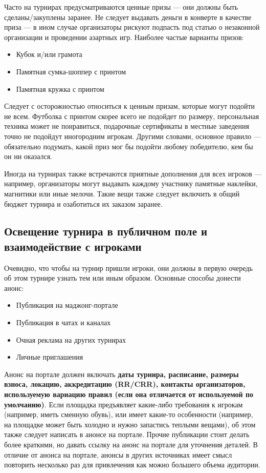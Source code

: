 Часто на турнирах предусматриваются ценные призы --- они должны быть сделаны/закуплены заранее. Не следует выдавать деньги в конверте в качестве приза --- в ином случае организаторы рискуют подпасть под статью о незаконной организации и проведении азартных игр. Наиболее частые варианты призов:
\begin{itemize}
	\item Кубок и/или грамота
	\item Памятная сумка-шоппер с принтом
	\item Памятная кружка с принтом
\end{itemize}

Следует с осторожностью относиться к ценным призам, которые могут подойти не всем. Футболка с принтом скорее всего не подойдет по размеру, персональная техника может не понравиться, подарочные сертификаты в местные заведения точно не подойдут иногородним игрокам. Другими словами, основное правило --- обязательно подумать, какой приз мог бы подойти любому победителю, кем бы он ни оказался.

Иногда на турнирах также встречаются приятные дополнения для всех игроков --- например, организаторы могут выдавать каждому участнику памятные наклейки, магнитики или иные мелочи. Такие вещи также следует включить в общий бюджет турнира и озаботиться их заказом заранее.

\subsection{Освещение турнира в публичном поле и взаимодействие с игроками}

Очевидно, что чтобы на турнир пришли игроки, они должны в первую очередь об этом турнире узнать тем или иным образом. Основные способы донести анонс:
\begin{itemize}
	\item Публикация на маджонг-портале
	\item Публикация в чатах и каналах
	\item Очная реклама на других турнирах
	\item Личные приглашения
\end{itemize}

Анонс на портале должен включать \textbf{даты турнира, расписание, размеры взноса, локацию, аккредитацию (RR/CRR), контакты организаторов, используемую вариацию правил (если она отличается от используемой по умолчанию)}. Если площадка предъявляет какие-либо требования к игрокам (например, иметь сменную обувь), или имеет какие-то особенности (например, на площадке может быть холодно и нужно запастись теплыми вещами), об этом также следует написать в анонсе на портале. Прочие публикации стоит делать более краткими, но давать ссылку на анонс на портале для уточнения деталей. В отличие от анонса на портале, анонсы в других источниках имеет смысл повторить несколько раз для привлечения как можно большего объема аудитории.

